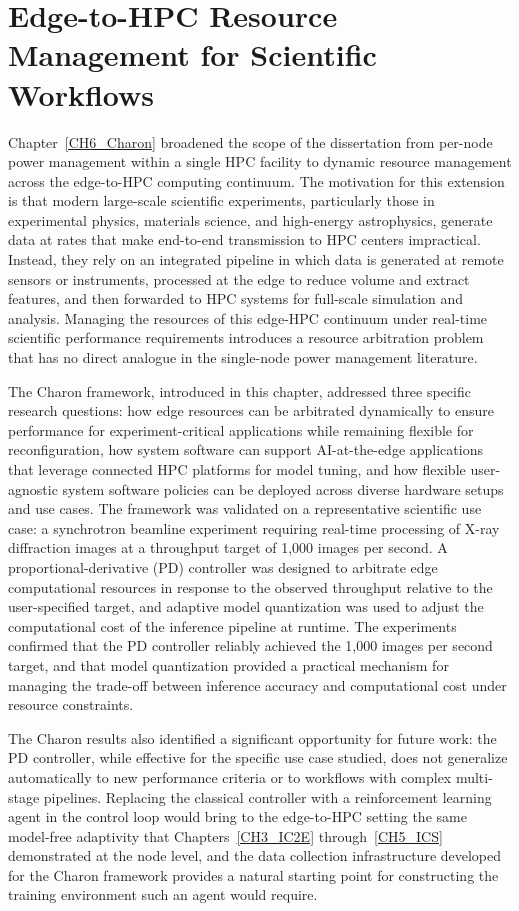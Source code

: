 \section{Edge-to-HPC Resource Management for Scientific Workflows}

Chapter~\ref{CH6_Charon} broadened the scope of the dissertation from per-node power
management within a single HPC facility to dynamic resource management across the
edge-to-HPC computing continuum.
The motivation for this extension is that modern large-scale scientific experiments,
particularly those in experimental physics, materials science, and high-energy
astrophysics, generate data at rates that make end-to-end transmission to HPC centers
impractical.
Instead, they rely on an integrated pipeline in which data is generated at remote
sensors or instruments, processed at the edge to reduce volume and extract features,
and then forwarded to HPC systems for full-scale simulation and analysis.
Managing the resources of this edge-HPC continuum under real-time scientific performance
requirements introduces a resource arbitration problem that has no direct analogue in
the single-node power management literature.

The Charon framework, introduced in this chapter, addressed three specific research
questions: how edge resources can be arbitrated dynamically to ensure performance for
experiment-critical applications while remaining flexible for reconfiguration, how
system software can support AI-at-the-edge applications that leverage connected HPC
platforms for model tuning, and how flexible user-agnostic system software policies can
be deployed across diverse hardware setups and use cases.
The framework was validated on a representative scientific use case: a synchrotron
beamline experiment requiring real-time processing of X-ray diffraction images at a
throughput target of 1,000 images per second.
A proportional-derivative (PD) controller was designed to arbitrate edge computational
resources in response to the observed throughput relative to the user-specified target,
and adaptive model quantization was used to adjust the computational cost of the
inference pipeline at runtime.
The experiments confirmed that the PD controller reliably achieved the 1,000 images per
second target, and that model quantization provided a practical mechanism for managing
the trade-off between inference accuracy and computational cost under resource constraints.

The Charon results also identified a significant opportunity for future work: the
PD controller, while effective for the specific use case studied, does not generalize
automatically to new performance criteria or to workflows with complex multi-stage
pipelines.
Replacing the classical controller with a reinforcement learning agent in the control
loop would bring to the edge-to-HPC setting the same model-free adaptivity that
Chapters~\ref{CH3_IC2E} through~\ref{CH5_ICS} demonstrated at the node level, and
the data collection infrastructure developed for the Charon framework provides a
natural starting point for constructing the training environment such an agent would
require.


